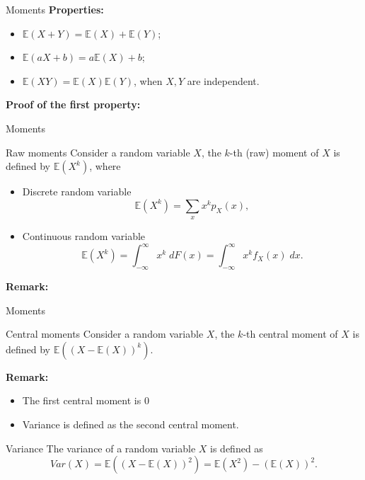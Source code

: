\documentclass [aspectratio=169]{beamer}
\begin{document}
\begin{frame}{Moments}
\textbf{Properties:} 
\begin{itemize}
    \item $\mathbb{E}(X+Y) = \mathbb{E}(X) + \mathbb{E}(Y)$;
    \item $\mathbb{E}(aX + b) = a\mathbb{E}(X) + b$;
    \item $\mathbb{E}(XY) = \mathbb{E}(X)\mathbb{E}(Y)$, when $X, Y$ are independent.
\end{itemize}
\vspace{0.1in}
\textbf{Proof of the first property:}
\vspace{1.5in}
\end{frame}


\begin{frame}{Moments}
\begin{block}{Raw moments}
Consider a random variable $X$, the $k$-th (raw) moment of $X$ is defined by $\mathbb{E}(X^k)$, where 
\begin{itemize}
    \item Discrete random variable
    $$
    \mathbb{E}(X^k) = \sum_{x}x^k p_X(x),
    $$
    \item Continuous random variable
    $$
    \mathbb{E}(X^k) = \int_{-\infty}^\infty x^k \;dF(x) = \int_{-\infty}^\infty x^kf_X(x)\;dx.
    $$
\end{itemize}
\end{block}
\vspace{0.1in}
\textbf{Remark:} \\
\vspace{0.5in}
\end{frame}

\begin{frame}{Moments}
\begin{block}{Central moments}
Consider a random variable $X$, the $k$-th central moment of $X$ is defined by $\mathbb{E}((X - \mathbb{E}(X))^k)$.
\end{block}
\vspace{0.1in}
\textbf{Remark:} \\
\begin{itemize}
    \item The first central moment is $0$
    \item Variance is defined as the second central moment.
\end{itemize}
\begin{block}{Variance}
The variance of a random variable $X$ is defined as
$$
Var(X) = \mathbb{E}((X - \mathbb{E}(X))^2) = \mathbb{E}(X^2) - (\mathbb{E}(X))^2.
$$
\end{block}
\end{frame}
\end{document}
